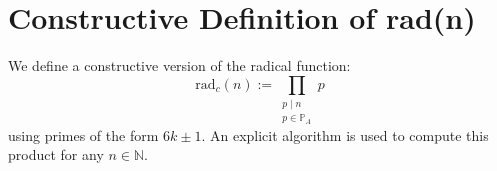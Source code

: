 
\section{Constructive Definition of rad(n)}
We define a constructive version of the radical function:
\[
\mathrm{rad}_c(n) := \prod_{\substack{p \mid n \\ p \in \mathbb{P}_A}} p
\]
using primes of the form \( 6k \pm 1 \).
An explicit algorithm is used to compute this product for any \( n \in \mathbb{N} \).
